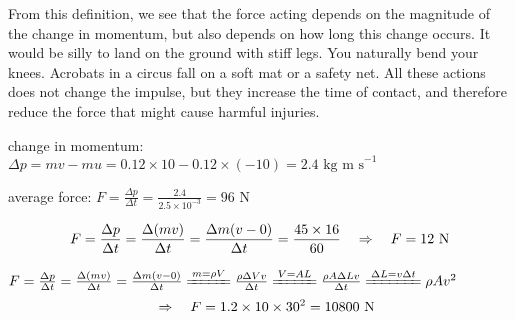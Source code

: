 From this definition, we see that the force acting depends on the magnitude of the change in momentum, but also depends on how long this change occurs. It would be silly to land on the ground with stiff legs. You naturally bend your knees. Acrobats in a circus fall on a soft mat or a safety net. All these actions does not change the impulse, but they increase the time of contact, and therefore reduce the force that might cause harmful injuries.


\begin{soln} change in momentum: $\Delta p = mv - mu = 0.12 \times 10 - 0.12 \times (-10) = 2.4 \text{ kg m s}^{-1}$

average force: $F=\frac{\Delta p}{\Delta t} = \frac{2.4}{2.5 \times10^{-3}} = 96 \text{ N}$ \end{soln}


\begin{soln}
\begin{equation*}
	F = \frac{\Delta p}{\Delta t} = \frac{\Delta (mv)}{\Delta t} = \frac{\Delta m (v-0)}{\Delta t} = \frac{45 \times 16}{60} \quad \Rightarrow \quad F = 12\text{ N} 
\end{equation*}
\end{soln}


\begin{soln}

{
	\centering
	
	$ F = \frac{\Delta p}{\Delta t} = \frac{\Delta (mv)}{\Delta t} = \frac{\Delta m (v-0)}{\Delta t} \xlongequal{m=\rho V} \frac{\rho \Delta V v}{\Delta t} \xlongequal{V=AL} \frac{\rho A \Delta L v}{\Delta t} \xlongequal{\Delta L = v \Delta t} \rho A v^2 $
	\eqyskip\begin{equation*}
	\quad \Rightarrow \quad F = 1.2 \times 10 \times 30^2 = 10800 \text{ N} 
	\end{equation*}
	
}
\end{soln}

